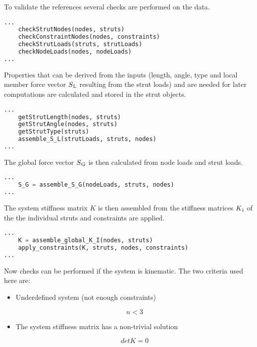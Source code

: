 \pagebreak

To validate the references several checks are performed on the data.

\begin{inconsolata}
\begin{lstlisting}[language=python]
...
    checkStrutNodes(nodes, struts)
    checkConstraintNodes(nodes, constraints)
    checkStrutLoads(struts, strutLoads)
    checkNodeLoads(nodes, nodeLoads)
...
\end{lstlisting}
\end{inconsolata}

Properties that can be derived from the inputs (length, angle, type and local member force vector $S\textsubscript{L}$ resulting from the strut loads) and are needed for later computations are calculated and stored in the strut objects.

\begin{inconsolata}
\begin{lstlisting}[language=python]
...
    getStrutLength(nodes, struts)
    getStrutAngle(nodes, struts)
    getStrutType(struts)
    assemble_S_L(strutLoads, struts, nodes)
...
\end{lstlisting}
\end{inconsolata}

The global force vector $S\textsubscript{G}$ is then calculated from node loads and strut loads.

\begin{inconsolata}
\begin{lstlisting}[language=python]
...
    S_G = assemble_S_G(nodeLoads, struts, nodes)
...
\end{lstlisting}
\end{inconsolata}

The system stiffness matrix $K$ is then assembled from the stiffness matrices $K\textsubscript{i}$ of the the individual struts and constraints are applied.

\begin{inconsolata}
\begin{lstlisting}[language=python]
...
    K = assemble_global_K_I(nodes, struts)
    apply_constraints(K, struts, nodes, constraints)
...
\end{lstlisting}
\end{inconsolata}

Now checks can be performed if the system is kinematic. The two criteria used here are:
\begin{itemize}

  \item Underdefined system (not enough constraints)

\begin{equation}
n < 3
\end{equation}

  \item The system stiffness matrix has a non-trivial solution

\begin{equation}
det K = 0
\end{equation}

\end{itemize}

